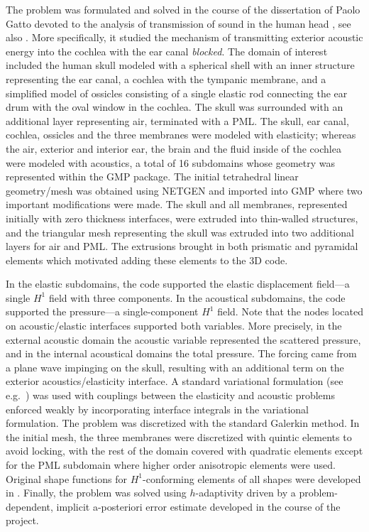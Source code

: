 The problem was formulated and solved in the course of the dissertation of Paolo Gatto devoted to the analysis of transmission of sound in the human head \cite{gatto2012phd}, see also \cite{demkowicz2011bone,gatto2013bone}. More specifically, it studied the mechanism of transmitting exterior acoustic energy into the cochlea with the ear canal {\em blocked}. The domain of interest included the human skull modeled with a spherical shell with an inner structure representing the ear canal, a cochlea with the tympanic membrane, and a simplified model of ossicles consisting of a single elastic rod connecting the ear drum with the oval window in the cochlea. The skull was surrounded with an additional layer representing air, terminated with a PML.
The skull, ear canal, cochlea, ossicles and the three membranes were modeled with elasticity; whereas the air, exterior and interior ear, the brain and the fluid inside of the cochlea were modeled with acoustics, a total of 16 subdomains whose geometry was represented within the GMP package. The initial tetrahedral linear geometry/mesh was obtained using NETGEN and imported into GMP where two important modifications were made. The skull and all membranes, represented initially with zero thickness interfaces, were extruded into thin-walled structures, and the triangular mesh representing the skull was extruded into two additional layers for air and PML. The extrusions brought in both prismatic and pyramidal elements which motivated adding these elements to the \hp3D code.

In the elastic subdomains, the code supported the elastic displacement field---a single $H^1$ field with three components. In the acoustical subdomains, the code supported the pressure---a single-component $H^1$ field. Note that the nodes located on acoustic/elastic interfaces supported both variables. More precisely, in the external acoustic domain the acoustic variable represented the scattered pressure, and in the internal acoustical domains the total pressure. The forcing came from a plane wave impinging on the skull, resulting with an additional term on the exterior acoustics/elasticity interface. A standard variational formulation (see e.g.~\cite{hpbook2}) was used with couplings between the elasticity and acoustic problems enforced weakly by incorporating interface integrals in the variational formulation. 
The problem was discretized with the standard Galerkin method. In the initial mesh, the three membranes were discretized with quintic elements to avoid locking, with the rest of the domain covered with quadratic elements except for the PML subdomain where higher order anisotropic elements were used. Original shape functions for $H^1$-conforming elements of all shapes were developed in \cite{gatto2010shape}. Finally, the problem was solved using $h$-adaptivity driven by a problem-dependent, implicit a-posteriori error estimate developed in the course of the project.

